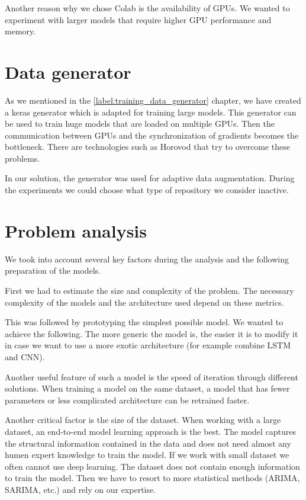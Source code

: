 \documentclass[thesis=M,english]{FITthesis}[2019/12/23]
\begin{document}
Another reason why we chose Colab is the availability of GPUs. We wanted to experiment with larger models that require higher GPU performance and memory.

\section{Data generator}
As we mentioned in the \ref{label:training_data_generator} chapter, we have created a keras generator which is adapted for training large models. This generator can be used to train huge models that are loaded on multiple GPUs. Then the communication between GPUs and the synchronization of gradients becomes the bottleneck. There are technologies such as Horovod that try to overcome these problems.

In our solution, the generator was used for adaptive data augmentation. During the experiments we could choose what type of repository we consider inactive. 

\section{Problem analysis}
We took into account several key factors during the analysis and the following preparation of the models. 

First we had to estimate the size and complexity of the problem. The necessary complexity of the models and the architecture used depend on these metrics. 

This was followed by prototyping the simplest possible model. We wanted to achieve the following. The more generic the model is, the easier it is to modify it in case we want to use a more exotic architecture (for example combine LSTM and CNN).

Another useful feature of such a model is the speed of iteration through different solutions. When training a model on the same dataset, a model that has fewer parameters or less complicated architecture can be retrained faster. 

Another critical factor is the size of the dataset. When working with a large dataset, an end-to-end model learning approach is the best. The model captures the structural information contained in the data and does not need almost any humen expert knowledge to train the model. If we work with small dataset we often cannot use deep learning. The dataset does not contain enough information to train the model. Then we have to resort to more statistical methods (ARIMA, SARIMA, etc.) and rely on our expertise.
\end{document}
